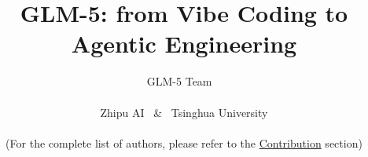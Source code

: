 \documentclass{article}
\title{GLM-5: from Vibe Coding to Agentic Engineering}
\author{
{GLM-5 Team}
~\\\\
Zhipu AI ~\&~ Tsinghua University\\\\
(For the complete list of authors, please refer to the \hyperref[sec:contribution]{Contribution} section)
{}
}
\theoremstyle{definition}
\begin{document}
\maketitle

\vspace{-1.5em}
\begin{abstract}



\end{abstract}











\clearpage




\clearpage


\end{document}
